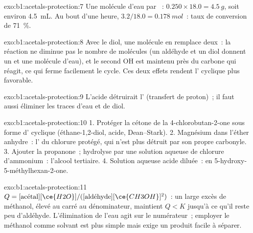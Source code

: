 \begin{solution}{exo:b1:acetals-protection:7}
Une molécule d'eau par ~: $0.250 \times 18.0 = \qty{4.5}{g}$, soit
environ \qty{4.5}{mL}. Au bout d'une heure, $3.2/18.0 = \qty{0.178}{mol}$~:
taux de conversion de \qty{71}{\percent}.
\end{solution}

\begin{solution}{exo:b1:acetals-protection:8}
Avec le diol, une molécule en remplace deux~: la réaction ne diminue pas
le nombre de molécules (un aldéhyde et un diol donnent un  et une
molécule d'eau), et le second OH est maintenu près du carbone qui
réagit, ce qui ferme facilement le cycle. Ces deux effets rendent
l' cyclique plus favorable.
\end{solution}

\begin{solution}{exo:b1:acetals-protection:9}
L'acide détruirait l' (transfert de proton)~; il faut
aussi éliminer les traces d'eau et de diol.
\end{solution}

\begin{solution}{exo:b1:acetals-protection:10}
1. Protéger la cétone de la 4-chlorobutan-2-one sous forme d'
cyclique (éthane-1,2-diol,  acide, Dean--Stark). 2. Magnésium
dans l'éther anhydre~: l' du chlorure protégé, qui n'est
plus détruit par son propre carbonyle. 3. Ajouter la propanone~;
hydrolyse par une solution aqueuse de chlorure d'ammonium~: l'alcool
tertiaire. 4. Solution aqueuse acide diluée~:  en
5-hydroxy-5-méthylhexan-2-one.
\end{solution}

\begin{solution}{exo:b1:acetals-protection:11}
$Q = [\text{acétal}][\ce{H2O}]/([\text{aldéhyde}][\ce{CH3OH}]^2)$~: un
large excès de méthanol, élevé au carré au dénominateur, maintient
$Q < K$ jusqu'à ce qu'il reste peu d'aldéhyde. L'élimination de l'eau
agit sur le numérateur~; employer le méthanol comme solvant est plus
simple mais exige un produit facile à séparer.
\end{solution}

